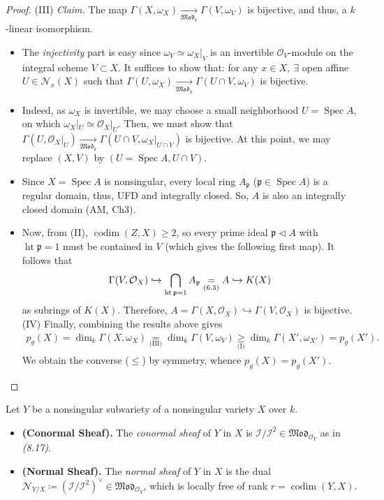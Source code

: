 \documentclass[11pt,a4paper,footinclude=true,headinclude=true]{scrbook} %
\DeclareMathOperator{\Spec}{Spec}
\DeclareMathOperator{\Ht}{ht}
\DeclareMathOperator{\codim}{codim}
\newcommand{\II}{\mathscr{I}}
\newcommand{\NN}{\mathcal{N}}
\newcommand{\OO}{\mathcal{O}}
\newcommand{\pp}{\mathfrak{p}}
\newcommand{\<}{\langle}
\newcommand{\>}{\rangle}
\newcommand{\MOD}{\mathfrak{Mod}}
\newenvironment{definition*}[2][Definition]
    { \begin{mdframed}[backgroundcolor=blue!20] \textbf{#1.}\ }
    {  \end{mdframed}}
\begin{document}
\begin{proof}
    (III) \textit{Claim.} The map $\Gamma(X,\omega_X)\xrightarrow[\MOD_k]{}\Gamma(V,\omega_V)$ is bijective, and thus, a $k$-linear isomorphism.
    \begin{itemize}
        \item The \textit{injectivity} part is easy since $\omega_V\simeq\omega_X|_V$ is an invertible $\OO_V$-module on the integral scheme $V\subset X$. It suffices to show that: for any $x\in X,\ \exists$ open affine $U\in\NN_x(X)$ such that $\Gamma(U,\omega_X)\xrightarrow[\MOD_k]{}\Gamma(U\cap V,\omega_V)$ is bijective.
        \item Indeed, as $\omega_X$ is invertible, we may choose a small neighborhood $U=\Spec A$, on which $\omega_X|_U\simeq\OO_X|_U$. Then, we must show that $\Gamma(U,\OO_X|_U)\xrightarrow[\MOD_k]{}\Gamma(U\cap V,\omega_X|_{U\cap V})$ is bijective. At this point, we may replace $(X,V)$ by $(U=\Spec A,U\cap V)$.
        \item Since $X=\Spec A$ is nonsingular, every local ring $A_\pp$ ($\pp\in\Spec A$) is a regular domain, thus, UFD and integrally closed. So, $A$ is also an integrally closed domain (AM, Ch3).
        \item Now, from (II), $\codim(Z,X)\geq2$, so every prime ideal $\pp\triangleleft A$ with $\Ht\pp=1$ must be contained in $V$ (which gives the following first map). It follows that
        \begin{align*}
            \Gamma(V,\OO_X)\xhookrightarrow[]{}\bigcap_{\Ht\pp=1}A_\pp\underset{\text{(6.3)}}{=}A\xhookrightarrow{}K(X)
        \end{align*}
        as subrings of $K(X)$. Therefore, $A=\Gamma(X,\OO_X)\hookrightarrow\Gamma(V,\OO_X)$ is bijective.\\
        
        (IV) Finally, combining the results above gives
        \begin{align*}
            p_g(X)=\dim_k\Gamma(X,\omega_X)\underset{\text{(III)}}{=}\dim_k\Gamma(V,\omega_V)\underset{\text{(I)}}{\geq}\dim_k\Gamma(X',\omega_{X'})=p_g(X').
        \end{align*}
        We obtain the converse ($\leq$) by symmetry, whence $p_g(X)=p_g(X')$.
    \end{itemize}
\end{proof}

\begin{definition*}{}
    Let $Y$ be a nonsingular subvariety of a nonsingular variety $X$ over $k$.
    \begin{itemize}
        \item \textbf{(Conormal Sheaf).} The \textit{conormal sheaf} of $Y$ in $X$ is $\II/\II^2\in\MOD_{\OO_Y}$ as in \textit{(8.17)}.
        \item \textbf{(Normal Sheaf).} The \textit{normal sheaf} of $Y$ in $X$ is the dual $\NN_{Y/X}\coloneqq(\II/\II^2)^\vee\in\MOD_{\OO_Y}$, which is locally free of rank $r=\codim(Y,X)$.
    \end{itemize}
\end{definition*}
\end{document}
